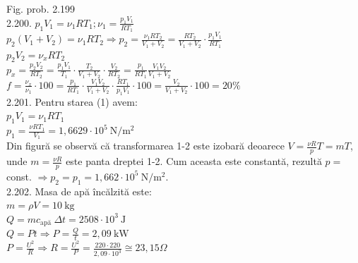 Fig. prob. 2.199\\

2.200. $p_{1} V_{1}=\nu_{1} R T_{1} ; \nu_{1}=\frac{p_{1} V_{1}}{R T_{1}}$\\ $p_{2}\left(V_{1}+V_{2}\right)=\nu_{1} R T_{2} \Rightarrow p_{2}=\frac{\nu_{1} R T_{2}}{V_{1}+V_{2}}=\frac{R T_{2}}{V_{1}+V_{2}} \cdot \frac{p_{1} V_{1}}{R T_{1}}$\\ $p_{2} V_{2}=\nu_{x} R T_{2}$\\ $p_{x}=\frac{p_{2} V_{2}}{R T_{2}}=\frac{p_{1} V_{1}}{T_{1}} \cdot \frac{T_{2}}{V_{1}+V_{2}} \cdot \frac{V_{2}}{R T_{2}}=\frac{p_{1}}{R T_{1}} \frac{V_{1} V_{2}}{V_{1}+V_{2}}$\\ $f=\frac{\nu_{x}}{\nu_{1}} \cdot 100=\frac{p_{1}}{R T_{1}} \cdot \frac{V_{1} V_{2}}{V_{1}+V_{2}} \cdot \frac{R T_{1}}{p_{1} V_{1}} \cdot 100=\frac{V_{2}}{V_{1}+V_{2}} \cdot 100=20 \%$\\

2.201. Pentru starea (1) avem:\\ $p_{1} V_{1}=\nu_{1} R T_{1}$\\ $p_{1}=\frac{\nu R T_{1}}{V_{1}}=1,6629 \cdot 10^{5} \mathrm{~N} / \mathrm{m}^{2}$\\ Din figură se observă că transformarea 1-2 este izobară deoarece $V=\frac{\nu R}{p} T=m T$, unde $m=\frac{\nu R}{p}$ este panta dreptei 1-2. Cum aceasta este constantă, rezultă $p=$ const. $\Rightarrow p_{2}=p_{1}=1,662 \cdot 10^{5} \mathrm{~N} / \mathrm{m}^{2}$.\\

2.202. Masa de apă încălzită este:\\ $m=\rho V=10 \mathrm{~kg}$\\ $Q=m c_{\text {apă }} \Delta t=2508 \cdot 10^{3} \mathrm{~J}$\\ $Q=P t \Rightarrow P=\frac{Q}{t}=2,09 \mathrm{~kW}$\\ $P=\frac{U^{2}}{R} \Rightarrow R=\frac{U^{2}}{P}=\frac{220 \cdot 220}{2,09 \cdot 10^{3}} \cong 23,15 \Omega$\\

